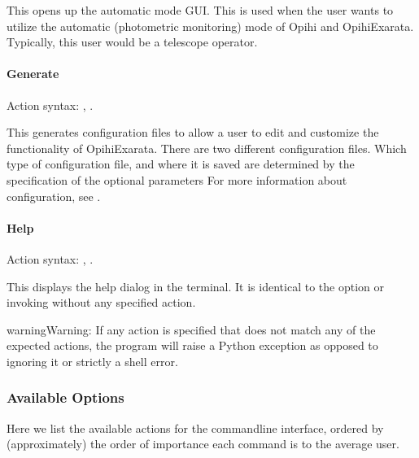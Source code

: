 \documentclass[letterpaper,11pt,english]{sphinxmanual}
\begin{document}
\sphinxAtStartPar
This opens up the automatic mode GUI. This is used when the user wants to
utilize the automatic (photometric monitoring) mode of Opihi and OpihiExarata.
Typically, this user would be a telescope operator.


\paragraph{Generate}
\label{\detokenize{user/command_line:generate}}\label{\detokenize{user/command_line:user-command-line-available-actions-generate}}
\sphinxAtStartPar
Action syntax: , .

\sphinxAtStartPar
This generates configuration files to allow a user to edit and customize the
functionality of OpihiExarata. There are two different configuration files.
Which type of configuration file, and where it is saved are determined by the
specification of the optional parameters
For more information about configuration, see {\hyperref[\detokenize{user/configuration:user-configuration}]{}}.


\paragraph{Help}
\label{\detokenize{user/command_line:help}}\label{\detokenize{user/command_line:user-command-line-available-actions-help}}
\sphinxAtStartPar
Action syntax: , .

\sphinxAtStartPar
This displays the help dialog in the terminal. It is identical to the
 option or invoking  without any specified action.

\begin{sphinxadmonition}{warning}{Warning:}
\sphinxAtStartPar
If any action is specified that does not match any of the expected actions,
the program will raise a Python exception as opposed to ignoring it or
strictly a shell error.
\end{sphinxadmonition}


\subsubsection{Available Options}
\label{\detokenize{user/command_line:available-options}}\label{\detokenize{user/command_line:user-command-line-available-options}}
\sphinxAtStartPar
Here we list the available actions for the command\sphinxhyphen{}line interface, ordered by
(approximately) the order of importance each command is to the average user.
\end{document}
